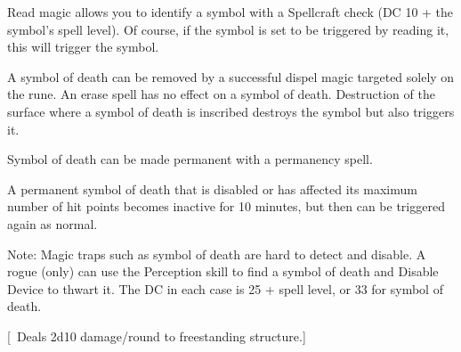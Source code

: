 {Read magic allows you to identify a symbol with a Spellcraft check (DC 10 + the symbol's spell level). Of course, if the symbol is set to be triggered by reading it, this will trigger the symbol.

A symbol of death can be removed by a successful dispel magic targeted solely on the rune. An erase spell has no effect on a symbol of death. Destruction of the surface where a symbol of death is inscribed destroys the symbol but also triggers it.

Symbol of death can be made permanent with a permanency spell.

A permanent symbol of death that is disabled or has affected its maximum number of hit points becomes inactive for 10 minutes, but then can be triggered again as normal.

Note: Magic traps such as symbol of death are hard to detect and disable. A rogue (only) can use the Perception skill to find a symbol of death and Disable Device to thwart it. The DC in each case is 25 + spell level, or 33 for symbol of death.}
        
[ Deals 2d10 damage/round to freestanding structure.]
        
